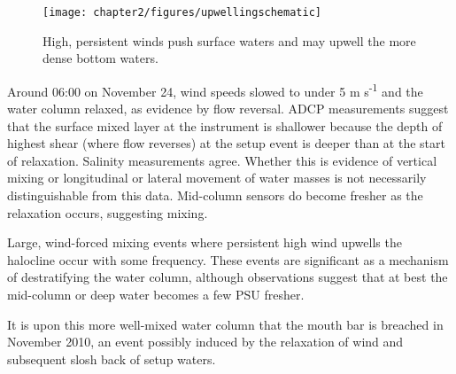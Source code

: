\begin{figure}[h!]
\centering
	\texttt{[image: chapter2/figures/upwellingschematic]}
\caption{High, persistent winds push surface waters and may upwell the more dense bottom waters.} \label{fig:schematicupwelling}
\end{figure}

Around 06:00 on November 24, wind speeds slowed to under 5 m s\textsuperscript{-1} and the water column relaxed, as evidence by flow reversal. ADCP measurements suggest that the surface mixed layer at the instrument is shallower because the depth of highest shear (where flow reverses) at the setup event is deeper than at the start of relaxation. Salinity measurements agree. Whether this is evidence of vertical mixing or longitudinal or lateral movement of water masses is not necessarily distinguishable from this data. Mid-column sensors do become fresher as the relaxation occurs, suggesting mixing. 

Large, wind-forced mixing events where persistent high wind upwells the halocline occur with some frequency. These events are significant as a mechanism of destratifying the water column, although observations suggest that at best the mid-column or deep water becomes a few PSU fresher. 

It is upon this more well-mixed water column that the mouth bar is breached in November 2010, an event possibly induced by the relaxation of wind and subsequent slosh back of setup waters. 

